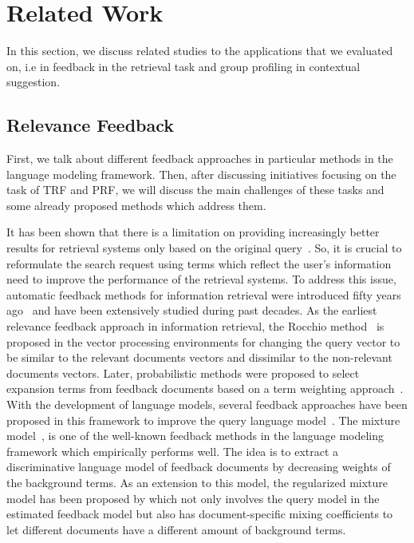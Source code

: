 \section{Related Work}
In this section, we discuss related studies to the applications that we evaluated \acswlm on, i.e in feedback in the retrieval task and group profiling in contextual suggestion. 

\subsection{Relevance Feedback}
First, we talk about different feedback approaches in particular methods in the language modeling framework. Then, after discussing initiatives focusing on the task of TRF and PRF, we will discuss the main challenges of these tasks and some already proposed methods which address them.

It has been shown that there is a limitation on providing increasingly better results for retrieval systems only based on the original query~\citep{Rijsbergen:1986}. So, it is crucial to reformulate the search request using terms which reflect the user's information need to improve the performance of the retrieval systems. 
To address this issue, automatic feedback methods for information retrieval were introduced fifty years ago~\citep{Rocchio:1971} and have been extensively studied  during past decades.
As the earliest relevance feedback approach in information retrieval, the Rocchio method~\citep{Rocchio:1971} is proposed in the vector processing environments for changing the query vector to be similar to the relevant documents vectors and dissimilar to the non-relevant documents vectors. 
Later, probabilistic methods were proposed to select expansion terms from feedback documents based on a term weighting approach~\citep{Robertson:1976,Rijsbergen:1981}. With the development of language models, several feedback approaches have been proposed in this framework to improve the query language model~\citep{Zhai:SMM:2001,Tao:2006,Lavrenko:2001,Hiemstra:2004,Lv:2014}. 
The mixture model~\citep{Zhai:SMM:2001}, is one of the well-known feedback methods in the language modeling framework which empirically performs well. The idea is to extract a discriminative language model of feedback documents by decreasing weights of the background terms. 
As an extension to this model, the regularized mixture model has been proposed by \citet{Tao:2006} which not only involves the query model in the estimated feedback model but also has document-specific mixing coefficients to let different documents have a different amount of background terms.

